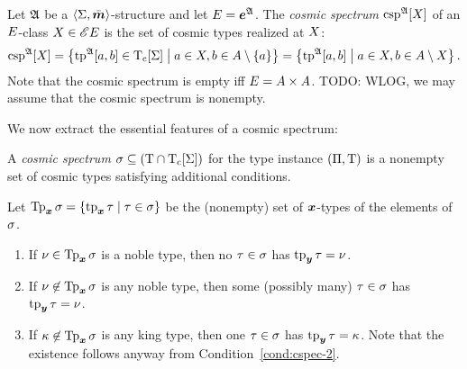 \begin{definition}
Let $\mathfrak{A}$ be a $\left\langle \mathrm{\Sigma},\bar{\bm{m}} \right\rangle$-structure and let $E = \bm{e}^{\mathfrak{A}}$.
The \emph{cosmic spectrum} $\operatorname{csp}^{\mathfrak{A}}[X]$ of an $E$-class
$X \in {\mathscr{E}E}$ is the set of cosmic types realized at $X$:
\[
  \operatorname{csp}^{\mathfrak{A}}[X] = \left\{\operatorname{tp}^{\mathfrak{A}}[a,b] \in \mathrm{T}_{\mathrm{c}}[\mathrm{\Sigma}]\mathrel{}\middle|\mathrel{}a\in X, b 
  \in A\setminus\left\{a\right\}\right\} = \left\{\operatorname{tp}^{\mathfrak{A}}[a,b]\mathrel{}\middle|\mathrel{}a \in X, b \in
  A \setminus X\right\}.
\]
Note that the cosmic spectrum is empty iff $E = A\times A$.
TODO: WLOG, we may assume that the cosmic spectrum is nonempty.
\end{definition}
We now extract the essential features of a cosmic spectrum:
\begin{definition}
A \emph{cosmic spectrum} $\sigma \subseteq (\mathrm{T} \cap \mathrm{T}_{\mathrm{c}}[\mathrm{\Sigma}])$ for the
type instance $(\Pi,\mathrm{T})$ is a nonempty set of cosmic types satisfying
additional conditions.

Let $\operatorname{Tp}_{\bm{x}}\sigma = \left\{\operatorname{tp}_{\bm{x}}\tau\mathrel{}\middle|\mathrel{}\tau \in \sigma\right\}$ be the (nonempty) set of
$\bm{x}$-types of the elements of $\sigma$.
\begin{enumerate}
  \item\label{cond:cspec-1} If $\nu \in \operatorname{Tp}_{\bm{x}}\sigma$ is a noble type, then no
  $\tau \in \sigma$ has $\operatorname{tp}_{\bm{y}}\tau = \nu$.
  \item\label{cond:cspec-2} If $\nu \not\in \operatorname{Tp}_{\bm{x}}\sigma$ is any noble type, then
  some (possibly many) $\tau \in \sigma$ has $\operatorname{tp}_{\bm{y}}\tau = \nu$.
  \item\label{cond:cspec-3} If $\kappa \not\in \operatorname{Tp}_{\bm{x}}\sigma$ is any king type, then
  one $\tau \in \sigma$ has $\operatorname{tp}_{\bm{y}}\tau = \kappa$. Note that the existence follows
  anyway from Condition~\ref{cond:cspec-2}.
\end{enumerate}
\end{definition}
